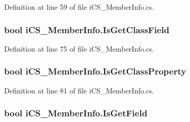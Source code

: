 Definition at line 59 of file i\+C\+S\+\_\+\+Member\+Info.\+cs.

\hypertarget{classi_c_s___member_info_a24b52ba6a2bbda4461a0aa2791ca7756}{
\subsubsection[{Is\+Get\+Class\+Field}]{\setlength{\rightskip}{0pt plus 5cm}bool i\+C\+S\+\_\+\+Member\+Info.\+Is\+Get\+Class\+Field\hspace{0.3cm}{\ttfamily [get]}}}\label{classi_c_s___member_info_a24b52ba6a2bbda4461a0aa2791ca7756}


Definition at line 75 of file i\+C\+S\+\_\+\+Member\+Info.\+cs.

\hypertarget{classi_c_s___member_info_abb5da6031a0722604a805a30ed0df6f9}{
\subsubsection[{Is\+Get\+Class\+Property}]{\setlength{\rightskip}{0pt plus 5cm}bool i\+C\+S\+\_\+\+Member\+Info.\+Is\+Get\+Class\+Property\hspace{0.3cm}{\ttfamily [get]}}}\label{classi_c_s___member_info_abb5da6031a0722604a805a30ed0df6f9}


Definition at line 81 of file i\+C\+S\+\_\+\+Member\+Info.\+cs.

\hypertarget{classi_c_s___member_info_a7809dd141b45f4e01c45f7723f02ec55}{
\subsubsection[{Is\+Get\+Field}]{\setlength{\rightskip}{0pt plus 5cm}bool i\+C\+S\+\_\+\+Member\+Info.\+Is\+Get\+Field\hspace{0.3cm}{\ttfamily [get]}}}\label{classi_c_s___member_info_a7809dd141b45f4e01c45f7723f02ec55}


